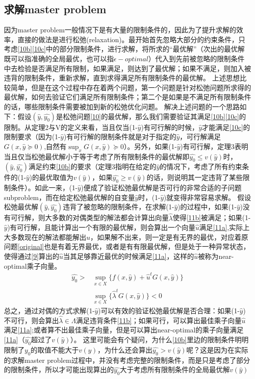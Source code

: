 \documentclass[UTF8,a4]{article}
\begin{document}
\subsection{求解master problem}

因为master problem一般情况下是有大量的限制条件的，因此为了提升求解的效率，直接的做法是进行松弛(relaxation)。最开始首先忽略大部分的约束条件，只考虑\eqref{10b}\eqref{10c}中的部分限制条件，进行求解，将所求的“最优解”（次出的最优解既可以指准确的全局最优，也可以指$\epsilon-optimal$）代入到先前被忽略的限制条件中去检验是否满足所有限制，如果满足，则达到了最优解；如果不满足，则加入被违背的限制条件，重新求解，直到求得满足所有限制条件的最优解。
上述思想比较简单，但是在这个过程中存在着两个问题，第一个问题是针对松弛问题所求得的最优解，如何去验证它们满足所有限制条件；第二个是如果是不满足所有限制条件的话，哪些限制条件需要被加到新的松弛优化问题。
解决上述问题的一个思路如下：假设$(\hat{y},\hat{y_0})$是松弛问题\eqref{10}的最优解，那么我们需要验证其满足\eqref{10b}\eqref{10c}的限制。从定理2与V的定义来看，当且仅当(1-$\hat{y}$)有可行解的时候，$\hat{y}$才能满足\eqref{10c}的限制要求（因为(1-$\hat{y}$)有可行解的限制条件就是对于指定的$\hat{y}$，可行解满足$G(x,\hat{y}\succeq 0)$,自然有$\sup_xG(x,\hat{y})\succeq 0$）。另外，如果(1-$\hat{y}$)有可行解，定理3表明当且仅当松弛最优解小于等于考虑了所有限制条件的最优解即$\hat{y_0}\leqslant v(\hat{y})$时，$(\hat{y},\hat{y_0})$满足约束\eqref{10b}的要求（定理3指明在给定的$\hat{y}$的情况下，考虑了所有约束条件的(1-$\hat{y}$)的最优取值为$v(\hat{y})$，如果$\hat{y_0}\geqslant v(\hat{y})$的话，则说明其一定违背了某些限制条件）。如此一来，(1-$\hat{y}$)便成了验证松弛最优解是否可行的非常合适的子问题subproblem，而在给定松弛最优解的自变量$\hat{y}$时，(1-$\hat{y}$)就变得非常容易求解。
假设松弛最优解$(\hat{y},\hat{y_0})$违背了被忽略的限制条件，在求解(1-$\hat{y}$)的过程中，如果(1-$\hat{y}$)没有可行解，则大多数的对偶类型的解法都会计算出向量$\hat{\lambda}$使得\eqref{11b}被满足；如果(1-$\hat{y}$)有可行解，且能计算出一个有限的最优解，则会算出一个向量$\hat{u}$满足\eqref{11a},实际上大多数现在的解法都能解出$\hat{u}$，如果解不出来，则一定是有无界的最优，对应着原问题\eqref{original}也是有着无界最优，或者是有有限最优解，但是处于一种异常状态，使得通过\eqref{9}算出的$\hat{u}$当其足够靠近最优的时候满足\eqref{11a}，这样的$\hat{u}$被称为near-optimal乘子向量。
\begin{subequations}
\begin{align}
\label{11a}
\hat{y_0}>&\sup_{x\in X}\{f(x,\hat{y})+\hat{u}^tG(x,\hat{y})\}\\
\label{11b}
&\sup_{x\in X}\{\hat{\lambda}^tG(x,\hat{y})\}<0
\end{align}
\end{subequations}
总之，通过对偶的方式求解(1-$\hat{y}$)可以有效的验证松弛最优解是否合理：如果(1-$\hat{y}$)不可行，则会算出$\hat{\lambda}\in\Lambda$满足违背条件\eqref{11b}；如果可行，可以算出最佳乘子向量$\hat{u}$满足\eqref{11a};或者算不出最佳乘子向量，但是可以算出near-optimal的乘子向量满足\eqref{11a}（$\hat{y_0}$超过了$v(\hat{y})$）。
这里可能会有个疑问，为什么\eqref{10b}里边的限制条件明明限制了$y_0$的取值不能大于$v(y)$，为什么还会算出$\hat{y_0}>v(\hat{y})$呢？这是因为在实际的求解master problem过程中，并没有考虑完整的限制条件，而是只是考虑了部分的限制条件，所以才可能出现算出的$\hat{y_0}$大于考虑所有限制条件的全局最优解$v(\hat{y})$
\end{document}
